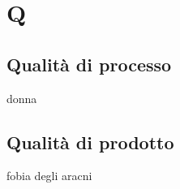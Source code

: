 \section{Q} 
\subsection{Qualità di processo} 
donna
\subsection{Qualità di prodotto} 
fobia degli aracni

